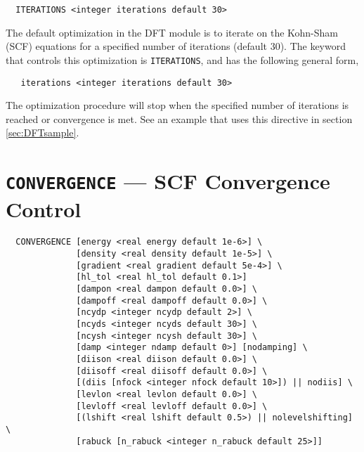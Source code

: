 \begin{verbatim}
  ITERATIONS <integer iterations default 30>
\end{verbatim}

The default optimization in the DFT module is to iterate on the 
Kohn-Sham (SCF) equations for a specified number of iterations
(default 30).  The keyword that controls this optimization 
is \verb+ITERATIONS+, and has the following general form,

\begin{verbatim}
   iterations <integer iterations default 30>
\end{verbatim}

The optimization procedure will stop when the specified number of
iterations is reached or convergence is met.  See an example
that uses this directive in section \ref{sec:DFTsample}.

\section{{\tt CONVERGENCE} --- SCF Convergence Control}
\label{sec:dftconv}

\begin{verbatim}
  CONVERGENCE [energy <real energy default 1e-6>] \
              [density <real density default 1e-5>] \
              [gradient <real gradient default 5e-4>] \
              [hl_tol <real hl_tol default 0.1>]
              [dampon <real dampon default 0.0>] \
              [dampoff <real dampoff default 0.0>] \
              [ncydp <integer ncydp default 2>] \
              [ncyds <integer ncyds default 30>] \
              [ncysh <integer ncysh default 30>] \
              [damp <integer ndamp default 0>] [nodamping] \
              [diison <real diison default 0.0>] \
              [diisoff <real diisoff default 0.0>] \
              [(diis [nfock <integer nfock default 10>]) || nodiis] \
              [levlon <real levlon default 0.0>] \
              [levloff <real levloff default 0.0>] \
              [(lshift <real lshift default 0.5>) || nolevelshifting] \
              [rabuck [n_rabuck <integer n_rabuck default 25>]]
\end{verbatim}

